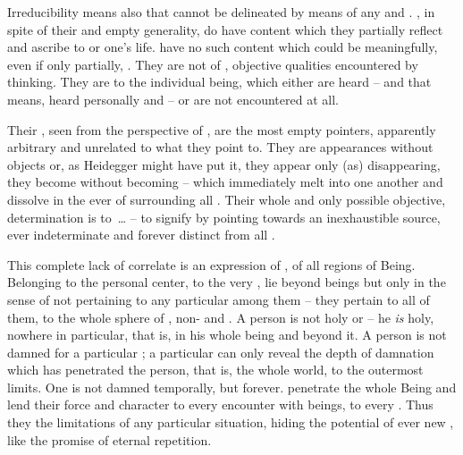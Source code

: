 
Irreducibility means also that  cannot be
delineated by means of any   and . 
, in spite of their  and empty generality, do have
content which they partially reflect and ascribe to
 or one's life.   have no such content
which could be meaningfully, even if only partially, . 
They are not  of , objective qualities 
encountered  by  thinking. They are 
 to the individual being,  which either are 
heard -- and that means, heard personally and  -- or are not
encountered at all. 

Their , seen from the perspective of , are the most
empty pointers, apparently arbitrary and unrelated to what they point
to.  They are appearances without objects or, as
Heidegger might have put it, they appear only (as) disappearing, they become
 without becoming  --  which immediately
melt into one another and dissolve in the ever   of
 surrounding all .  Their whole and only possible
objective,  determination is to~\ldots {} -- to {signify}
by pointing towards an inexhaustible source, ever indeterminate and forever
distinct from all .

\pa 
This complete lack of  correlate is an expression of
, of  all regions of Being. Belonging to the personal center, to the very
,  lie beyond beings but only in the sense of not
pertaining to any particular among them -- they pertain to all of them, to the
whole sphere of , non- and 
.  A person is not holy  or  -- he {\em is} holy, nowhere in particular, that is, in
his whole being and beyond it. A person is not damned for a particular ;
a particular  can only reveal the depth of damnation which has
penetrated the person, that is, the whole world, to the outermost limits. One is
not damned temporally, but forever.   penetrate the whole Being
and lend their force and character to every encounter with beings, to every
. Thus they  the limitations of any particular
situation, hiding the  potential of ever new , 
like the promise of eternal repetition.

